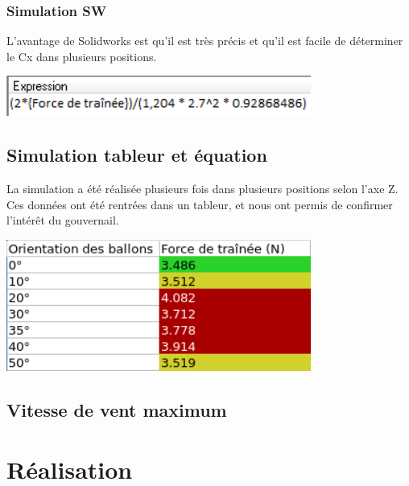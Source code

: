 \documentclass[a4paper,11pt]{article}
\begin{document}
\subsubsection{Simulation SW}
	L'avantage de Solidworks est qu'il est très précis et qu'il est facile de déterminer le Cx dans plusieurs positions.\\
	\begin{center}
		\includegraphics[width=10cm]{../Images/expressionCX.png}
	\end{center}

\subsection{Simulation tableur et équation}
	La simulation a été réalisée plusieurs fois dans plusieurs positions selon l'axe Z.\\
	Ces données ont été rentrées dans un tableur, et nous ont permis de confirmer l'intérêt du gouvernail.\\
	\begin{center}
    \includegraphics[width=10cm]{../Images/resultatsSW.png} \\
	\end{center}

\subsection{Vitesse de vent maximum}

\newpage

\section{Réalisation}
\end{document}
